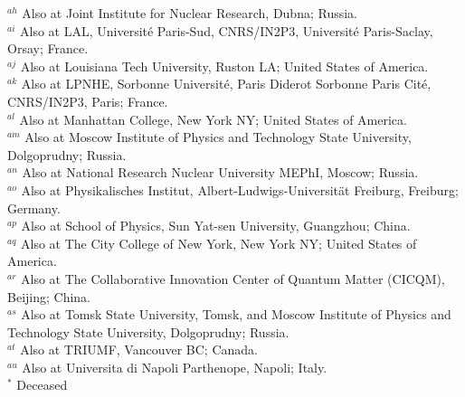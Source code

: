 \begin{flushleft}
$^{ah}$ Also at Joint Institute for Nuclear Research, Dubna; Russia.\\
$^{ai}$ Also at LAL, Universit\'e Paris-Sud, CNRS/IN2P3, Universit\'e Paris-Saclay, Orsay; France.\\
$^{aj}$ Also at Louisiana Tech University, Ruston LA; United States of America.\\
$^{ak}$ Also at LPNHE, Sorbonne Universit\'e, Paris Diderot Sorbonne Paris Cit\'e, CNRS/IN2P3, Paris; France.\\
$^{al}$ Also at Manhattan College, New York NY; United States of America.\\
$^{am}$ Also at Moscow Institute of Physics and Technology State University, Dolgoprudny; Russia.\\
$^{an}$ Also at National Research Nuclear University MEPhI, Moscow; Russia.\\
$^{ao}$ Also at Physikalisches Institut, Albert-Ludwigs-Universit\"{a}t Freiburg, Freiburg; Germany.\\
$^{ap}$ Also at School of Physics, Sun Yat-sen University, Guangzhou; China.\\
$^{aq}$ Also at The City College of New York, New York NY; United States of America.\\
$^{ar}$ Also at The Collaborative Innovation Center of Quantum Matter (CICQM), Beijing; China.\\
$^{as}$ Also at Tomsk State University, Tomsk, and Moscow Institute of Physics and Technology State University, Dolgoprudny; Russia.\\
$^{at}$ Also at TRIUMF, Vancouver BC; Canada.\\
$^{au}$ Also at Universita di Napoli Parthenope, Napoli; Italy.\\
$^{*}$ Deceased

\end{flushleft}

